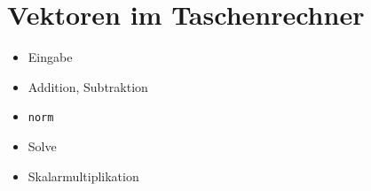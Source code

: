 \section{Vektoren im Taschenrechner}

\begin{itemize}
\item Eingabe
\item Addition, Subtraktion
\item \texttt{norm}
\item Solve
\item Skalarmultiplikation
\end{itemize}
